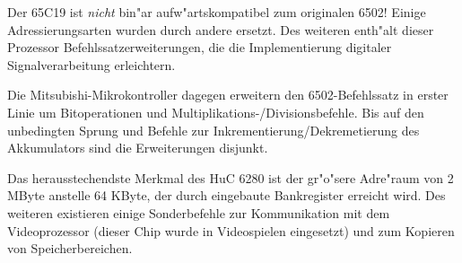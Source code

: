 \documentclass[12pt,a4paper,twoside]{report}
\begin{document}
Der 65C19 ist {\em nicht} bin"ar aufw"artskompatibel zum
originalen 6502!  Einige Adressierungsarten wurden durch andere
ersetzt.  Des weiteren enth"alt dieser Prozessor
Befehlssatzerweiterungen, die die Implementierung digitaler
Signalverarbeitung erleichtern.

Die Mitsubishi-Mikrokontroller dagegen erweitern den
6502-Befehlssatz in erster Linie um Bitoperationen und
Multiplikations-/Divisionsbefehle.  Bis auf den unbedingten Sprung und
Befehle zur Inkrementierung/Dekremetierung des Akkumulators sind die
Erweiterungen disjunkt.

Das herausstechendste Merkmal des HuC 6280 ist der gr"o"sere
Adre"raum von 2 MByte anstelle 64 KByte, der durch eingebaute
Bankregister erreicht wird.   Des weiteren existieren einige
Sonderbefehle zur Kommunikation mit dem Videoprozessor (dieser
Chip wurde in Videospielen eingesetzt) und zum Kopieren von
Speicherbereichen.
\end{document}
